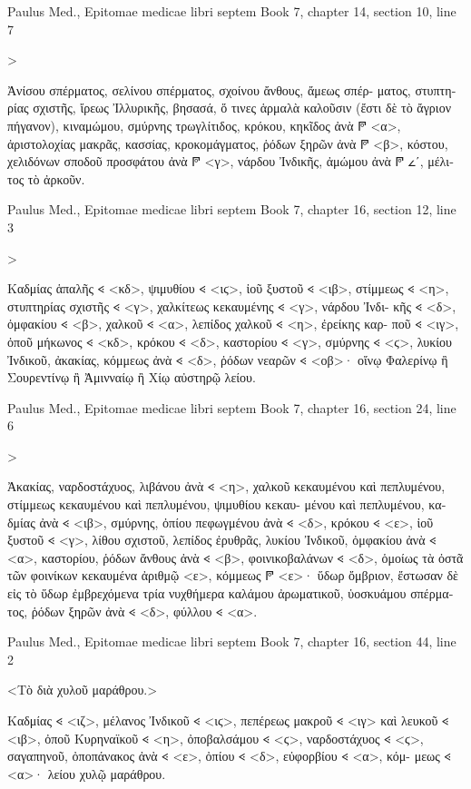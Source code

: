 \documentclass[12pt,letterpaper,twoside,final]{memoir}
\begin{document}
\begin{greek}
Paulus Med., Epitomae medicae libri septem 
Book 7, chapter 14, section 10, line 7

                                  >


 Ἀνίσου σπέρματος, σελίνου σπέρματος, σχοίνου ἄνθους, ἄμεως σπέρ-
ματος, στυπτηρίας σχιστῆς, ἴρεως Ἰλλυρικῆς, βησασά, ὅ τινες ἁρμαλὰ 
καλοῦσιν (ἔστι δὲ τὸ ἄγριον πήγανον), κιναμώμου, σμύρνης τρωγλίτιδος, 
κρόκου, κηκῖδος ἀνὰ 𐆄 <α>, ἀριστολοχίας μακρᾶς, κασσίας, κροκομάγματος, 
ῥόδων ξηρῶν ἀνὰ 𐆄 <β>, κόστου, χελιδόνων σποδοῦ προσφάτου ἀνὰ 𐆄 <γ>, 
νάρδου Ἰνδικῆς, ἀμώμου ἀνὰ 𐆄 𐅵ʹ, μέλιτος τὸ ἀρκοῦν. 



Paulus Med., Epitomae medicae libri septem 
Book 7, chapter 16, section 12, line 3

                                                             >


 Καδμίας ἁπαλῆς 𐅻 <κδ>, ψιμυθίου 𐅻 <ιϛ>, ἰοῦ ξυστοῦ 𐅻 <ιβ>, στίμμεως 
𐅻 <η>, στυπτηρίας σχιστῆς 𐅻 <γ>, χαλκίτεως κεκαυμένης 𐅻 <γ>, νάρδου Ἰνδι-
κῆς 𐅻 <δ>, ὀμφακίου 𐅻 <β>, χαλκοῦ 𐅻 <α>, λεπίδος χαλκοῦ 𐅻 <η>, ἐρείκης καρ-
ποῦ 𐅻 <ιγ>, ὀποῦ μήκωνος 𐅻 <κδ>, κρόκου 𐅻 <δ>, καστορίου 𐅻 <γ>, σμύρνης 𐅻 <ϛ>, 
λυκίου Ἰνδικοῦ, ἀκακίας, κόμμεως ἀνὰ 𐅻 <δ>, ῥόδων νεαρῶν 𐅻 <οβ>· οἴνῳ 
Φαλερίνῳ ἢ Σουρεντίνῳ ἢ Ἀμινναίῳ ἢ Χίῳ αὐστηρῷ λείου. 



Paulus Med., Epitomae medicae libri septem 
Book 7, chapter 16, section 24, line 6

                                       >


 Ἀκακίας, ναρδοστάχυος, λιβάνου ἀνὰ 𐅻 <η>, χαλκοῦ κεκαυμένου καὶ 
πεπλυμένου, στίμμεως κεκαυμένου καὶ πεπλυμένου, ψιμυθίου κεκαυ-
μένου καὶ πεπλυμένου, καδμίας ἀνὰ 𐅻 <ιβ>, σμύρνης, ὀπίου πεφωγμένου 
ἀνὰ 𐅻 <δ>, κρόκου 𐅻 <ε>, ἰοῦ ξυστοῦ 𐅻 <γ>, λίθου σχιστοῦ, λεπίδος ἐρυθρᾶς, 
λυκίου Ἰνδικοῦ, ὀμφακίου ἀνὰ 𐅻 <α>, καστορίου, ῥόδων ἄνθους ἀνὰ 𐅻 <β>, 
φοινικοβαλάνων 𐅻 <δ>, ὁμοίως τὰ ὀστᾶ τῶν φοινίκων κεκαυμένα ἀριθμῷ <ε>, 
κόμμεως 𐆄 <ε>· ὕδωρ ὄμβριον, ἔστωσαν δὲ εἰς τὸ ὕδωρ ἐμβρεχόμενα 
τρία νυχθήμερα καλάμου ἀρωματικοῦ, ὑοσκυάμου σπέρματος, ῥόδων 
ξηρῶν ἀνὰ 𐅻 <δ>, φύλλου 𐅻 <α>. 



Paulus Med., Epitomae medicae libri septem 
Book 7, chapter 16, section 44, line 2

    
<Τὸ διὰ χυλοῦ μαράθρου.>


 Καδμίας 𐅻 <ιζ>, μέλανος Ἰνδικοῦ 𐅻 <ιϛ>, πεπέρεως μακροῦ 𐅻 <ιγ> καὶ 
λευκοῦ 𐅻 <ιβ>, ὀποῦ Κυρηναϊκοῦ 𐅻 <η>, ὀποβαλσάμου 𐅻 <ϛ>, ναρδοστάχυος 
𐅻 <ϛ>, σαγαπηνοῦ, ὀποπάνακος ἀνὰ 𐅻 <ε>, ὀπίου 𐅻 <δ>, εὐφορβίου 𐅻 <α>, κόμ-
μεως 𐅻 <α>· λείου χυλῷ μαράθρου. 




\end{greek}
\end{document}
